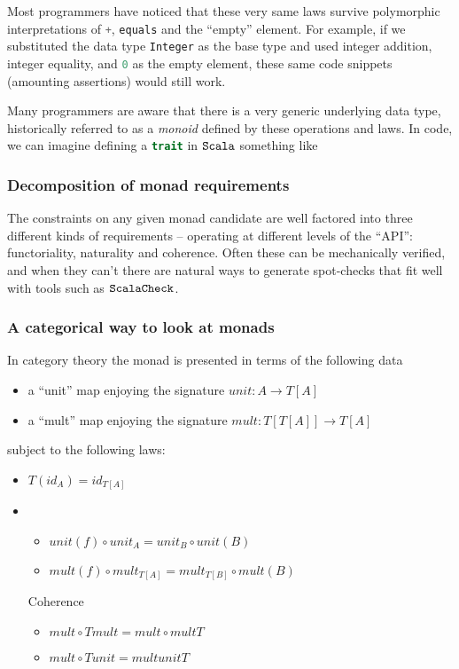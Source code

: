 Most programmers have noticed that these very same laws survive
polymorphic interpretations of \lstinline[language=Scala]!+!, \lstinline[language=Scala]!equals! and the
``empty'' element. For example, if we substituted the data type
\lstinline[language=Scala]!Integer! as the base type and used integer addition, integer
equality, and \lstinline[language=Scala]!0! as the empty element, these same code
snippets (amounting assertions) would still work.

Many programmers are aware that there is a very generic underlying
data type, historically referred to as a \emph{monoid} defined by
these operations and laws. In code, we can imagine defining a
\lstinline[language=Scala]!trait! in $\texttt{Scala}$ something like



\subsubsection{Decomposition of monad requirements}

The constraints on any given monad candidate are well factored into
three different kinds of requirements -- operating at different levels
of the ``API'': functoriality, naturality and coherence. Often these
can be mechanically verified, and when they can't there are natural
ways to generate spot-checks that fit well with tools such as
$\texttt{ScalaCheck}$.

\subsubsection{A categorical way to look at monads}

In category theory the monad is presented in terms of the
following data

\begin{itemize}
  \item a ``unit'' map enjoying the signature $unit : A \to T[A]$
  \item a ``mult'' map enjoying the signature $mult : T[T[A]] \to T[A]$
\end{itemize}

subject to the following laws:

\begin{itemize}
  \item $T( id_A ) = id_{T[A]}$ %
  \item %
    \begin{itemize}
    \item $unit(f) \circ unit_{A} = unit_{B} \circ unit(B)$ %
    \item $mult(f) \circ mult_{T[A]} = mult_{T[B]} \circ mult(B)$ %
    \end{itemize}
  \item[Coherence]
    \begin{itemize}
    \item $mult \circ T mult = mult \circ mult T$ %
    \item $mult \circ T unit = mult unit T$ %
    \end{itemize}
\end{itemize}

